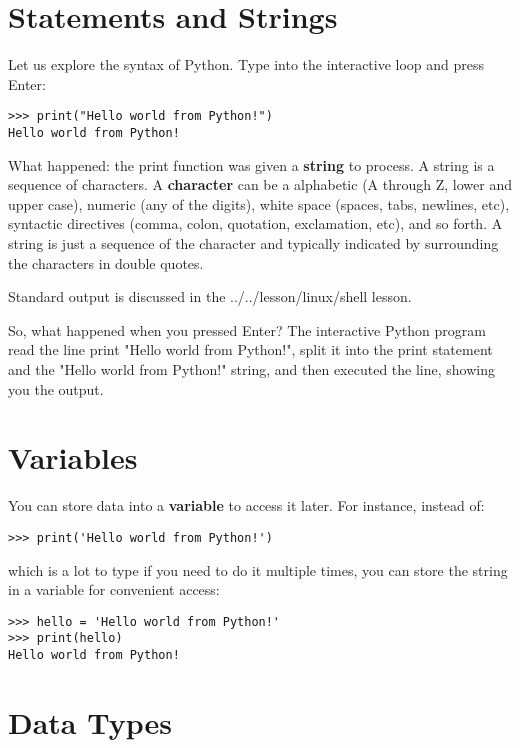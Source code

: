 \FILENAME

\section{Statements and Strings}\label{statements-and-strings}

Let us explore the syntax of Python. Type into the interactive loop and
press Enter:

\begin{verbatim}
>>> print("Hello world from Python!")
Hello world from Python!
\end{verbatim}

What happened: the print function was given a \textbf{string} to
process. A string is a sequence of characters. A \textbf{character} can
be a alphabetic (A through Z, lower and upper case), numeric (any of the
digits), white space (spaces, tabs, newlines, etc), syntactic directives
(comma, colon, quotation, exclamation, etc), and so forth. A string is
just a sequence of the character and typically indicated by surrounding
the characters in double quotes.

Standard output is discussed in the ../../lesson/linux/shell lesson.

So, what happened when you pressed Enter? The interactive Python program
read the line print "Hello world from Python!", split it into the print
statement and the "Hello world from Python!" string, and then executed
the line, showing you the output.

\section{Variables}\label{variables}

You can store data into a \textbf{variable} to access it later. For
instance, instead of:

\begin{verbatim}
>>> print('Hello world from Python!')
\end{verbatim}

which is a lot to type if you need to do it multiple times, you can
store the string in a variable for convenient access:

\begin{verbatim}
>>> hello = 'Hello world from Python!'
>>> print(hello)
Hello world from Python!
\end{verbatim}

\section{Data Types}\label{data-types}

